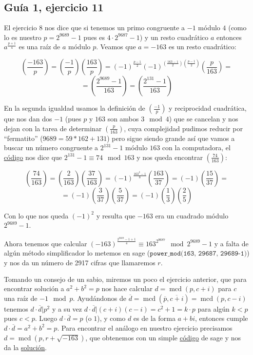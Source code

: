 \documentclass[12pt]{amsart}
\DeclareMathOperator{\mcd}{mcd}
\newcommand{\leg}[2]{\left( \frac{#1}{#2} \right)}
\newcommand{\lp}{\left(}
\newcommand{\rp}{\right)}
\theoremstyle{plain}
\begin{document}






\subsection*{Guía 1, ejercicio 11}

El ejercicio 8 nos dice que si tenemos un primo congruente a 
$-1$ módulo $4$ (como lo es nuestro $p=2^{9689}-1$ pues es 
$4\cdot 2^{9687} -1$) y un resto cuadrático $a$ entonces 
$a^{\frac{p+1}{4}}$ es una raíz de $a$ módulo $p$. Veamos que 
$a = -163$ es un resto cuadrático:

$$\leg{-163}{p} =\leg{-1}{p}\leg{163}{p} = (-1)^{\frac{p-1}{2}}
(-1)^{\lp\frac{163-1}{2}\rp\lp\frac{p-1}{2}\rp} \leg{p}{163} =$$
$$= \leg{2^{9689}-1}{163}=\leg{2^{131}-1}{163}$$

En la segunda igualdad usamos la definición de $\leg{-1}{p}$ y 
reciprocidad cuadrática, que nos dan dos $-1$ (pues $p$ y $163$ 
son ambos $3\mod{4}$) que se cancelan y nos dejan con la tarea 
de determinar $\leg{p}{163}$, cuya complejidad pudimos reducir 
por ``fermatito'' ($9689 = 59*162 + 131$) pero sigue siendo 
grande así que vamos a buscar un número congruente a $2^{131}-1$ 
módulo $163$ con la computadora, el \hyperref[codigo1]{código} 
nos dice que $2^{131}-1\equiv 74 \mod{163}$ y nos queda 
encontrar $\leg{74}{163}$:

$$\leg{74}{163} = \leg{2}{163}\leg{37}{163} = (-1)^{\frac{163^2-1}{8}}
\leg{163}{37}= (-1) \leg{15}{37} =$$
$$= (-1)\leg{3}{37}\leg{5}{37} = (-1)\leg{1}{3}\leg{2}{5}$$

Con lo que nos queda $(-1)^2$ y resulta que $-163$ era un 
cuadrado módulo $2^{9689}-1$. 

Ahora tenemos que calcular $(-163)^{\frac{2^{9689}-1+1}{4}} 
\equiv 163^{2^{9687}} \mod{2^{9689}-1}$ y a falta de algún 
método simplificador lo metemos en sage 
($\texttt{power\_mod(163, 2\^{}9687, 2\^{}9689-1)}$) y nos
da un número de 2917 cifras que llamaremos $r$.

Tomando un consejo de un sabio, miremos un poco el ejercicio anterior, 
que para encontrar solución a $a^2 +b^2 = p$ nos hace calcular
$d=\mcd(p,c+i)$ para $c$ una raíz de $-1\mod p$. Ayudándonos de
$\overline{d} = \mcd\lp\overline{p},\overline{c+i}\rp = \mcd\lp p,c-i\rp$ 
tenemos $d\cdot \overline{d} |p^2$ y a su vez 
$d\cdot \overline{d} |(c+i)(c-i)=c^2+1 = k\cdot p$ para algún 
$k<p$ pues $c<p$. Luego $d\cdot \overline{d} = p$ (o $1$), y como
$d$ es de la forma $a+bi$, entonces cumple $d\cdot \overline{d}=a^2+b^2 = p$.
Para encontrar el análogo en nuestro ejercicio precisamos 
$d=\mcd \lp p,r+\sqrt{-163} \rp$, que obtenemos con un simple 
\hyperref[codigo2]{código} de sage y nos da la 
\hyperref[solucion2]{solución}.
\end{document}
